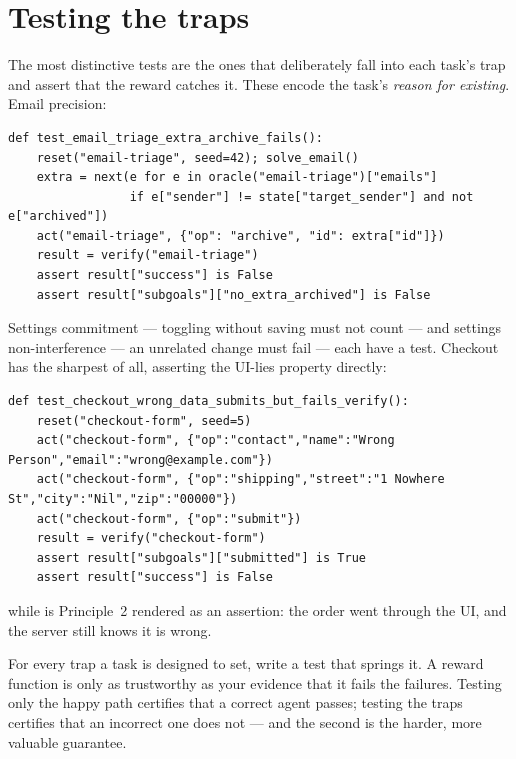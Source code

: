\documentclass[11pt,openany]{book}
\newcommand{\code}[1]{\textcolor{clayd}{\texttt{\detokenize{#1}}}}
\begin{document}
\section{Testing the traps}

The most distinctive tests are the ones that deliberately fall into each task's
trap and assert that the reward catches it. These encode the task's \emph{reason
for existing}. Email precision:

\begin{lstlisting}[style=py]
def test_email_triage_extra_archive_fails():
    reset("email-triage", seed=42); solve_email()
    extra = next(e for e in oracle("email-triage")["emails"]
                 if e["sender"] != state["target_sender"] and not e["archived"])
    act("email-triage", {"op": "archive", "id": extra["id"]})
    result = verify("email-triage")
    assert result["success"] is False
    assert result["subgoals"]["no_extra_archived"] is False
\end{lstlisting}

Settings commitment — toggling without saving must not count — and settings
non-interference — an unrelated change must fail — each have a test. Checkout has
the sharpest of all, asserting the UI-lies property directly:

\begin{lstlisting}[style=py]
def test_checkout_wrong_data_submits_but_fails_verify():
    reset("checkout-form", seed=5)
    act("checkout-form", {"op":"contact","name":"Wrong Person","email":"wrong@example.com"})
    act("checkout-form", {"op":"shipping","street":"1 Nowhere St","city":"Nil","zip":"00000"})
    act("checkout-form", {"op":"submit"})
    result = verify("checkout-form")
    assert result["subgoals"]["submitted"] is True
    assert result["success"] is False
\end{lstlisting}

\code{submitted is True} while \code{success is False} is Principle~2 rendered as
an assertion: the order went through the UI, and the server still knows it is
wrong.

\begin{principle}[.\ ]
For every trap a task is designed to set, write a test that springs it. A reward
function is only as trustworthy as your evidence that it fails the failures.
Testing only the happy path certifies that a correct agent passes; testing the
traps certifies that an incorrect one does not — and the second is the harder,
more valuable guarantee.
\end{principle}
\end{document}
